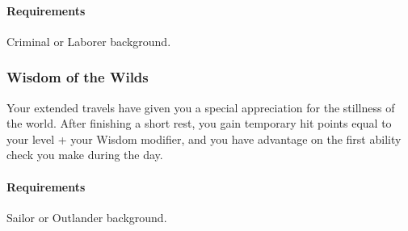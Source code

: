     \paragraph{Requirements} Criminal or Laborer background.
\subsubsection{Wisdom of the Wilds} \label{feat::wisdomofthewilds}
    Your extended travels have given you a special appreciation for the stillness of the world.
    After finishing a short rest, you gain temporary hit points equal to your level + your Wisdom modifier, and you have advantage on the first ability check you make during the day.
    \paragraph{Requirements} Sailor or Outlander background.

\newpage
